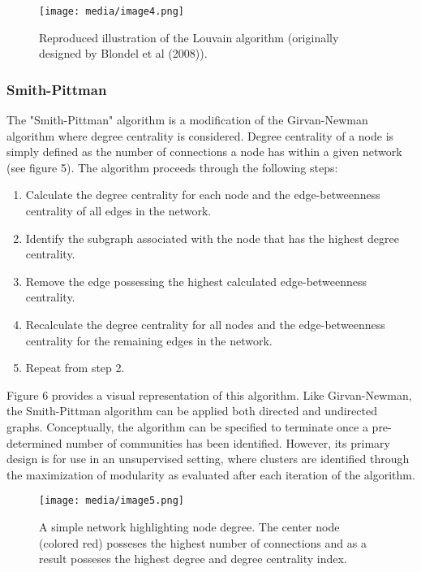 \documentclass{article}
\begin{document}
\begin{figure}
\centering
\texttt{[image: media/image4.png]}

\caption{Reproduced illustration of the Louvain algorithm
(originally designed by Blondel et al (2008)).}
\end{figure}

\subsubsection{Smith-Pittman}\label{smith-pittman}

The "Smith-Pittman" algorithm is a modification of the Girvan-Newman
algorithm where degree centrality is considered. Degree centrality of a
node is simply defined as the number of connections a node has within a
given network (see figure 5). The algorithm proceeds through the
following steps:

\begin{enumerate}
\def\labelenumi{\arabic{enumi}.}
\item
  Calculate the degree centrality for each node and the edge-betweenness
  centrality of all edges in the network.
\item
  Identify the subgraph associated with the node that has the highest
  degree centrality.
\item
  Remove the edge possessing the highest calculated edge-betweenness
  centrality.
\item
  Recalculate the degree centrality for all nodes and the
  edge-betweenness centrality for the remaining edges in the network.
\item
  Repeat from step 2.
\end{enumerate}

Figure 6 provides a visual representation of this algorithm. Like
Girvan-Newman, the Smith-Pittman algorithm can be applied both directed
and undirected graphs. Conceptually, the algorithm can be specified to
terminate once a pre-determined number of communities has been
identified. However, its primary design is for use in an unsupervised
setting, where clusters are identified through the maximization of
modularity as evaluated after each iteration of the algorithm.

\begin{figure}
\centering
\texttt{[image: media/image5.png]}
\caption{A simple network highlighting node degree.
The center node (colored red) posseses the highest number of connections
and as a result posseses the highest degree and degree centrality
index.}
\end{figure}
\end{document}

